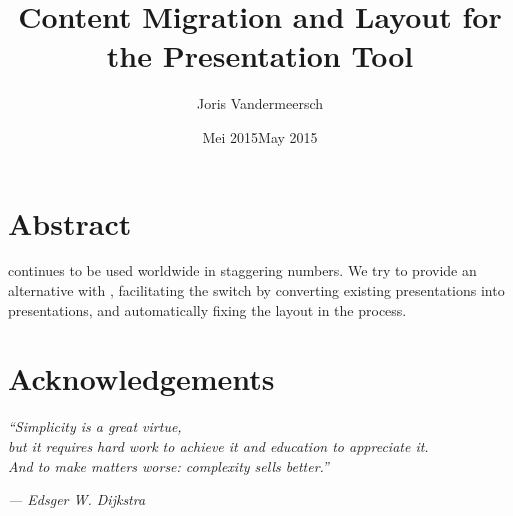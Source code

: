 \documentclass[a4paper,12pt]{report}
\author{Joris Vandermeersch}
\title{Content Migration and Layout for the \mxp Presentation Tool}
\date{Mei 2015}
\begin{document}
 \maketitlepage


 \date{May 2015}

 \maketitlepage

 \chapter*{Abstract}

  \ppt continues to be used worldwide in staggering numbers. We try to provide
  an alternative with \mxp, facilitating the switch by converting existing \ppt
  presentations into \mxp presentations, and automatically fixing the layout in
  the process.

 \chapter*{Acknowledgements}

  \emph{``Simplicity is a great virtue,\\
  but it requires hard work to achieve it and education to appreciate it.\\
  And to make matters worse: complexity sells better.''}

  \hfill\emph{--- Edsger W. Dijkstra}
\end{document}
